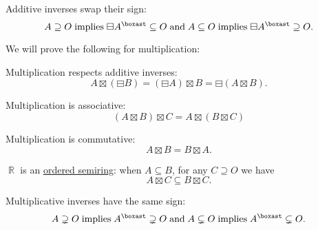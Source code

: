 \begin{proposition}
\begin{thmenum}[series=thm:field_of_real_numbers]
     Additive inverses swap their sign:
    \begin{equation}\label{eq:thm:field_of_real_numbers/addition_sign}
      A \supseteq O \T{implies} \boxminus A^\boxast \subseteq O \T{and} A \subseteq O \T{implies} \boxminus A^\boxast \supseteq O.
    \end{equation}
  \end{thmenum}

  We will prove the following for multiplication:
  \begin{thmenum}[resume=thm:field_of_real_numbers]
     Multiplication respects additive inverses:
    \begin{equation}\label{eq:thm:field_of_real_numbers/multiplication_and_additive_inverses}
      A \boxtimes (\boxminus B) = (\boxminus A) \boxtimes B = \boxminus (A \boxtimes B).
    \end{equation}

     Multiplication is associative:
    \begin{equation}\label{eq:thm:field_of_real_numbers/multiplication_associative}
      (A \boxtimes B) \boxtimes C = A \boxtimes (B \boxtimes C)
    \end{equation}

     Multiplication is commutative:
    \begin{equation}\label{eq:thm:field_of_real_numbers/multiplication_commutative}
      A \boxtimes B = B \boxtimes A.
    \end{equation}

     \( \BbbR \) is an \hyperref[def:ordered_semiring]{ordered semiring}: when \( A \subseteq B \), for any \( C \supseteq O \) we have
    \begin{equation}\label{eq:thm:field_of_real_numbers/multiplication_order}
      A \boxtimes C \subseteq B \boxtimes C.
    \end{equation}

     Multiplicative inverses have the same sign:
    \begin{equation}\label{eq:thm:field_of_real_numbers/multiplication_sign}
      A \supsetneq O \T{implies} A^\boxast \supsetneq O \T{and} A \subsetneq O \T{implies} A^\boxast \subsetneq O.
    \end{equation}


\end{thmenum}
\end{proposition}
